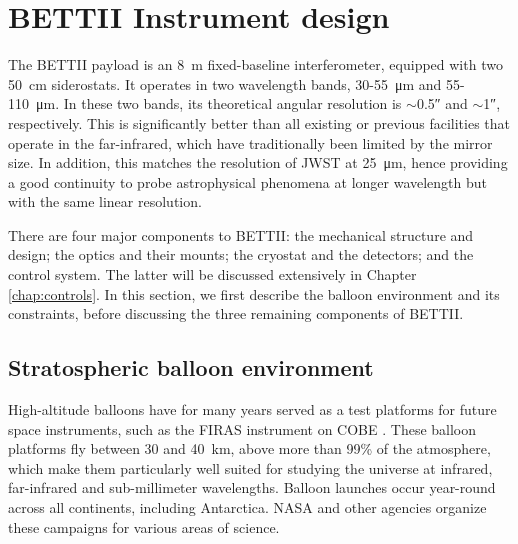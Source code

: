 \section{BETTII Instrument design}



The BETTII payload is an \SI{8}{\meter} fixed-baseline interferometer, equipped with two \SI{50}{\centi\meter} siderostats. It operates in two wavelength bands, 30-55~\si{\micro\meter} and 55-110~\si{\micro\meter}. In these two bands, its theoretical angular resolution is $\sim$\ang{;;0.5} and $\sim$\ang{;;1}, respectively. This is significantly better than all existing or previous facilities that operate in the far-infrared, which have traditionally been limited by the mirror size. In addition, this matches the resolution of JWST at \SI{25}{\micro\meter}, hence providing a good continuity to probe astrophysical phenomena at longer wavelength but with the same linear resolution.

There are four major components to BETTII: the mechanical structure and design; the optics and their mounts; the cryostat and the detectors; and the control system. The latter will be discussed extensively in Chapter \ref{chap:controls}. In this section, we first describe the balloon environment and its constraints, before discussing the three remaining components of BETTII. 

\subsection{Stratospheric balloon environment}

High-altitude balloons have for many years served as a test platforms for future space instruments, such as the FIRAS instrument on COBE \citep{Fixsen:2002jv}. These balloon platforms fly between 30 and \SI{40}{\kilo\meter}, above more than 99\% of the atmosphere, which make them particularly well suited for studying the universe at infrared, far-infrared and sub-millimeter wavelengths. Balloon launches occur year-round across all continents, including Antarctica. NASA and other agencies organize these campaigns for various areas of science.

